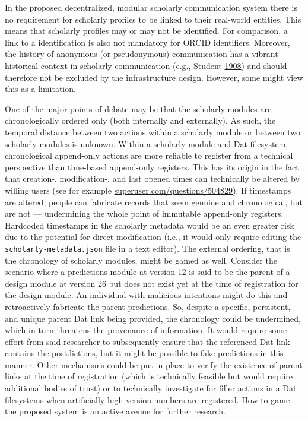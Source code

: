 \documentclass[a5paper]{book}
\begin{document}
In the proposed decentralized, modular scholarly communication system
there is no requirement for scholarly profiles to be linked to their
real-world entities. This means that scholarly profiles may or may not
be identified. For comparison, a link to a identification is also not
mandatory for ORCID identifiers. Moreover, the history of anonymous (or
pseudonymous) communication has a vibrant historical context in
scholarly communication (e.g., Student
\protect\hyperlink{ref-doi:10.1093ux2fbiometux2f6.1.1}{1908}) and should
therefore not be excluded by the infrastructure design. However, some
might view this as a limitation.

One of the major points of debate may be that the scholarly modules are
chronologically ordered only (both internally and externally). As such,
the temporal distance between two actions within a scholarly module or
between two scholarly modules is unknown. Within a scholarly module and
Dat filesystem, chronological append-only actions are more reliable to
register from a technical perspective than time-based append-only
registers. This has its origin in the fact that creation-,
modification-, and last opened times can technically be altered by
willing users (see for example
\href{https://superuser.com/questions/504829}{superuser.com/questions/504829}).
If timestamps are altered, people can fabricate records that seem
genuine and chronological, but are not --- undermining the whole point
of immutable append-only registers. Hardcoded timestamps in the
scholarly metadata would be an even greater risk due to the potential
for direct modification (i.e., it would only require editing the
\texttt{scholarly-metadata.json} file in a text editor). The external
ordering, that is the chronology of scholarly modules, might be gamed as
well. Consider the scenario where a predictions module at version 12 is
said to be the parent of a design module at version 26 but does not
exist yet at the time of registration for the design module. An
individual with malicious intentions might do this and retroactively
fabricate the parent predictions. So, despite a specific, persistent,
and unique parent Dat link being provided, the chronology could be
undermined, which in turn threatens the provenance of information. It
would require some effort from said researcher to subsequently ensure
that the referenced Dat link contains the postdictions, but it might be
possible to fake predictions in this manner. Other mechanisms could be
put in place to verify the existence of parent links at the time of
registration (which is technically feasible but would require additional
bodies of trust) or to technically investigate for filler actions in a
Dat filesystems when artificially high version numbers are registered.
How to game the proposed system is an active avenue for further
research.
\end{document}
